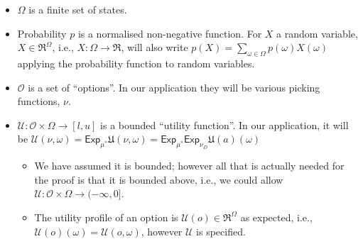 \documentclass[a4paper]{article}
\newcommand\Exp{\mathsf{Exp}}
\renewcommand\O{\mathcal{O}}
\newcommand\U{\mathfrak{U}} %
\newcommand\Uwald{\mathcal{U}} %
\newenvironment{CCM rewritten}
{\begingroup\color{blue}} %
{\endgroup}              %
\begin{document}
\begin{itemize}
	\item $\Omega$ is a finite set of states.
	\item Probability $p$ is a normalised non-negative function. For $X$ a random variable, $X\in\Re^\Omega$, i.e., $X:\Omega\to\Re$, will also write $p(X)=\sum_{\omega\in\Omega}p(\omega)X(\omega)$ applying the probability function to random variables. 
	\item $\O$ is a set of ``options''. In our application they will be various picking functions, $\nu$.
	\item $\Uwald:\O\times\Omega\to [l,u]$ is a bounded ``utility function''. In our application, it will be $\Uwald(\nu,\omega)=\Exp_{\mu^*}\U(\nu,\omega)=\Exp_{\mu^*}\Exp_{\nu_D}\U(a)(\omega)$ \begin{itemize}
		\item We have assumed it is bounded; however all that is actually needed for the proof is that it is bounded above, i.e., we could allow $\Uwald:\O\times\Omega\to (-\infty,0]$. 
		\item The utility profile of an option is $\Uwald(o)\in\Re^\Omega$ as expected, i.e., $\Uwald(o)(\omega)=\Uwald(o,\omega)$, however $\Uwald$ is specified. 
	\end{itemize}
\end{itemize}


%
\end{document}
